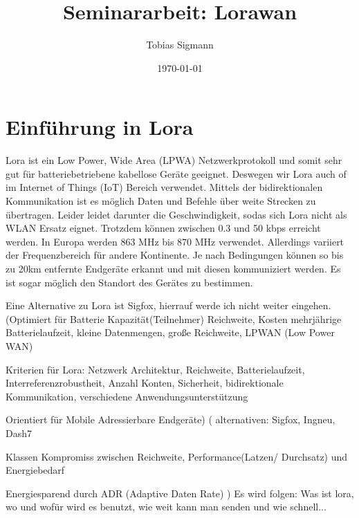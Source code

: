 \documentclass[a4paper,12pt]{article}
\author{Tobias Sigmann}
\title{Seminararbeit: Lorawan}
\date{\today}
\begin{document}
    \maketitle
    \newpage
    \tableofcontents
    \newpage
    \begin{abstract} 
       \cite{WhatIsLoRa}
       \newline
       \cite{Semtech}
    \end{abstract}

    \section{Einführung in Lora}
    Lora ist ein Low Power, Wide Area (LPWA) Netzwerkprotokoll und somit sehr gut für batteriebetriebene kabellose Geräte geeignet. Deswegen wir Lora auch of im Internet of Things (IoT) Bereich verwendet.
    Mittels der bidirektionalen Kommunikation ist es möglich Daten und Befehle über weite Strecken zu übertragen. Leider leidet darunter die Geschwindigkeit, sodas sich Lora nicht als WLAN Ersatz eignet.
    Trotzdem können zwischen 0.3 und 50 kbps erreicht werden. In Europa werden 863 MHz bis 870 MHz verwendet. Allerdings variiert der Frequenzbereich für andere Kontinente. Je nach Bedingungen können so bis zu 20km entfernte Endgeräte erkannt und mit diesen kommuniziert werden.
    Es ist sogar möglich den Standort des Gerätes zu bestimmen.
    
    Eine Alternative zu Lora ist Sigfox, hierrauf werde ich nicht weiter eingehen.
    \newline    
    \cite{WhatIsLoRa}(Optimiert für Batterie Kapazität(Teilnehmer) Reichweite, Kosten
    mehrjährige Batterielaufzeit, kleine Datenmengen, große Reichweite, LPWAN (Low Power WAN)
    
    Kriterien für Lora: Netzwerk Architektur, Reichweite, Batterielaufzeit, Interreferenzrobustheit, Anzahl Konten, Sicherheit, bidirektionale Kommunikation, verschiedene Anwendungsunterstützung
    
    Orientiert für Mobile Adressierbare Endgeräte)
    \newline{}
        \cite{LoraLimit}(
            alternativen: Sigfox, Ingneu, Dash7

            Klassen Kompromiss zwischen Reichweite, Performance(Latzen/ Durchsatz) und Energiebedarf

            Energiesparend durch ADR (Adaptive Daten Rate)
        )
    \newline{}\newline{} Es wird folgen: Was ist lora, wo und wofür wird es benutzt, wie weit kann man senden und wie schnell...
\end{document}
